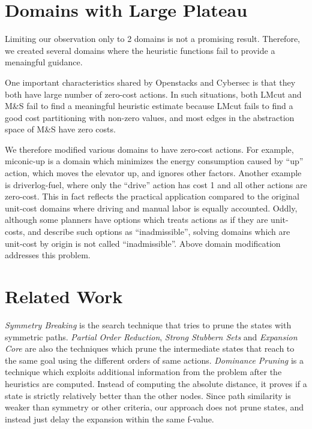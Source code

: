 
\section{Domains with Large Plateau}

Limiting our observation only to 2 domains is not a promising
result. Therefore, we created several domains where the \sota heuristic
functions fail to provide a menaingful guidance.

One important characteristics shared by Openstacks and Cybersec is that they both
have large number of zero-cost actions. In such situations, both LMcut
and M\&S fail to find a meaningful heuristic estimate because LMcut fails to
find a good cost partitioning with non-zero values, and most edges in the abstraction space of
M\&S have zero costs.

We therefore modified various domains to have zero-cost actions.
For example, miconic-up is a domain which minimizes the energy
consumption caused by ``up'' action, which moves the elevator up, and
ignores other factors.  Another example is driverlog-fuel, where only
the ``drive'' action has cost 1 and all other actions are zero-cost.
This in fact reflects the practical application compared to the original
unit-cost domains where driving and manual labor is equally accounted.
Oddly, although some planners have options which treats actions as if
they are unit-costs, and describe such options as ``inadmissible'',
solving domains which are unit-cost by origin is not called
``inadmissible''. Above domain modification addresses this problem.



\section{Related Work}
\label{sec-4}

\emph{Symmetry Breaking} \cite{Fox1998,pochter2011exploiting,domshlak2013symmetry} is the search technique that tries to prune the states with symmetric paths. \emph{Partial Order Reduction}, \emph{Strong Stubbern Sets} and \emph{Expansion Core} are also the techniques which prune the intermediate states that reach to the same goal using the different orders of same actions. \emph{Dominance Pruning} \cite{erol1994} is a technique which exploits additional information from the problem after the heuristics are computed. Instead of computing the absolute distance, it  proves if a state is strictly relatively better than the other nodes. Since path similarity is weaker than symmetry or other criteria, our approach does not prune states, and instead just delay the expansion within the same f-value.

